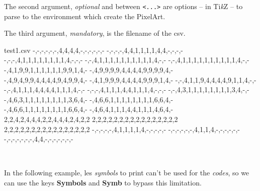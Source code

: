 \documentclass{article}
\newcommand\Cle[1]{{\bfseries\sffamily\textlangle #1\textrangle}}
\begin{document}
The second argument, \textit{optional} and between \texttt{<...>} are options -- in  Ti\textit{k}Z -- to parse to the environment which create the PixelArt.

\medskip

The third argument, \textit{mandatory}, is the filename of the \textsf{csv}.


\begin{PresentationCode}{}
\begin{filecontents*}[overwrite]{test1.csv}
	-,-,-,-,-,-,4,4,4,4,-,-,-,-,-,-
	-,-,-,-,4,4,1,1,1,1,4,4,-,-,-,-
	-,-,-,4,1,1,1,1,1,1,1,1,4,-,-,-
	-,-,4,1,1,1,1,1,1,1,1,1,1,4,-,-
	-,-,4,1,1,1,1,1,1,1,1,1,1,4,-,-
	-,4,1,9,9,1,1,1,1,1,1,9,9,1,4,-
	-,4,9,9,9,9,4,4,4,4,9,9,9,9,4,-
	-,4,9,4,9,9,4,4,4,4,9,4,9,9,4,-
	-,4,1,9,9,9,4,4,4,4,9,9,9,1,4,-
	-,-,4,1,1,9,4,4,4,4,9,1,1,4,-,-
	-,-,4,1,1,1,4,4,4,4,1,1,1,4,-,-
	-,-,-,4,1,1,1,4,4,1,1,1,4,-,-,-
	-,-,4,3,1,1,1,1,1,1,1,1,3,4,-,-
	-,4,6,3,1,1,1,1,1,1,1,1,3,6,4,-
	-,4,6,6,1,1,1,1,1,1,1,1,6,6,4,-
	-,4,6,6,1,1,1,1,1,1,1,1,6,6,4,-
	-,4,6,4,1,1,1,4,4,1,1,1,4,6,4,-
	2,2,4,2,4,4,4,2,2,4,4,4,2,4,2,2
	2,2,2,2,2,2,2,2,2,2,2,2,2,2,2,2
	2,2,2,2,2,2,2,2,2,2,2,2,2,2,2,2
	-,-,-,-,-,4,1,1,1,1,4,-,-,-,-,-
	-,-,-,-,-,-,4,1,1,4,-,-,-,-,-,-
	-,-,-,-,-,-,-,4,4,-,-,-,-,-,-,-
\end{filecontents*}
\end{PresentationCode}

\begin{PresentationCode}{}
~~
~~
\end{PresentationCode}

\pagebreak

In the following example, les \textit{symbols} to print can't be used for the \textit{codes}, so we can use the keys \Cle{Symbols} and \Cle{Symb} to bypass this limitation.
\end{document}
